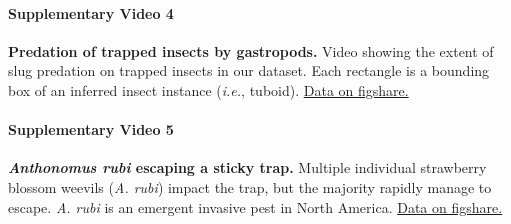 \documentclass[12pt]{article}
\begin{document}
	
	\paragraph*{Supplementary Video 4}
	\textbf{Predation of trapped insects by gastropods.} Video showing the extent of slug predation on trapped insects in our dataset. Each rectangle is a bounding box of an inferred insect instance (\emph{i.e.}, tuboid).
	\href{https://figshare.com/s/889c8af79a7f90db263e}{Data on figshare.}

	\paragraph*{Supplementary Video 5}
	\textbf{\emph{Anthonomus rubi} escaping a sticky trap.} Multiple individual strawberry blossom weevils (\emph{A. rubi}) impact the trap, but the majority rapidly manage to escape. \emph{A. rubi} is an emergent invasive pest in North America.
	\href{https://figshare.com/s/0872dcd897ef7b82d1a3}{Data on figshare.}
\end{document}
